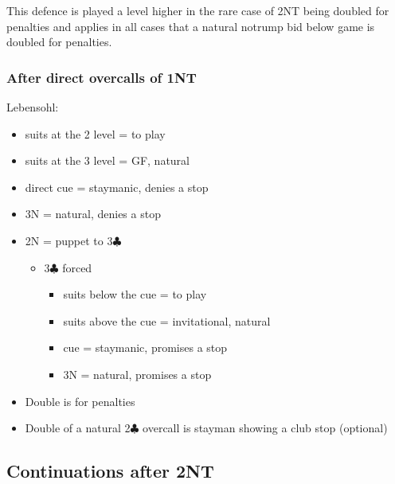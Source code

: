 \documentclass[a4paper,14pt]{extarticle}
\begin{document}
This defence is played a level higher in the rare case of 2NT being doubled for
penalties and applies in all cases that a natural notrump bid below game is doubled for
penalties.

\subsubsection{After direct overcalls of 1NT}
\label{sec:resp:lebensohl}
\label{note:13}

Lebensohl:

\begin{itemize}
\item suits at the 2 level = to play
\item suits at the 3 level = GF, natural
\item direct cue = staymanic, denies a stop
\item 3N = natural, denies a stop
\item 2N = puppet to 3$\clubsuit$
	\begin{itemize}
	\item 3$\clubsuit$ forced
		\begin{itemize}
		\item suits below the cue = to play
		\item suits above the cue = invitational, natural
		\item cue = staymanic, promises a stop
		\item 3N = natural, promises a stop
		\end{itemize}
	\end{itemize}
\item Double is for penalties
\item Double of a natural 2$\clubsuit$ overcall is stayman showing a club stop (optional)
\end{itemize}

\newpage

\subsection{Continuations after 2NT}
\label{sec:resp:2n}
\end{document}
